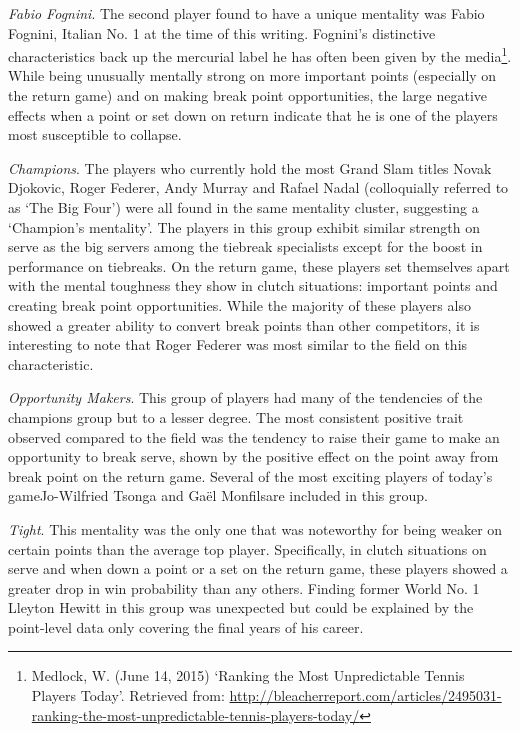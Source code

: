 \documentclass{Latex/svjour3}
\begin{document}
\textit{Fabio Fognini}. The second player found to have a unique mentality was
Fabio Fognini, Italian No. 1 at the time of this writing. Fognini's distinctive
characteristics back up the mercurial label he has often been given by the
media\footnote{Medlock, W. (June 14, 2015) `Ranking the Most Unpredictable
  Tennis Players Today'. Retrieved from:
  \url{http://bleacherreport.com/articles/2495031-ranking-the-most-unpredictable-tennis-players-today/}}. While
being unusually mentally strong on more important points (especially on the
return game) and on making break point opportunities, the large negative effects
when a point or set down on return indicate that he is one of the players most
susceptible to collapse.

\textit{Champions}. The players who currently hold the most Grand Slam titles
Novak Djokovic, Roger Federer, Andy Murray and Rafael Nadal (colloquially
referred to as `The Big Four') were all found in the same mentality cluster,
suggesting a `Champion's mentality'. The players in this group exhibit similar
strength on serve as the big servers among the tiebreak specialists except for
the boost in performance on tiebreaks. On the return game, these players set
themselves apart with the mental toughness they show in clutch situations:
important points and creating break point opportunities. While the majority of
these players also showed a greater ability to convert break points than other
competitors, it is interesting to note that Roger Federer was most similar to
the field on this characteristic.

\textit{Opportunity Makers}. This group of players had many of the tendencies of
the champions group but to a lesser degree. The most consistent positive trait
observed compared to the field was the tendency to raise their game to make an
opportunity to break serve, shown by the positive effect on the point away from
break point on the return game. Several of the most exciting players of today's
game\textemdash Jo-Wilfried Tsonga and Ga\"{e}l Monfils\textemdash are included
in this group. 

\textit{Tight}. This mentality was the only one that was noteworthy for being
weaker on certain points than the average top player. Specifically, in clutch
situations on serve and when down a point or a set on the return game, these
players showed a greater drop in win probability than any others. Finding former
World No. 1 Lleyton Hewitt in this group was unexpected but could be explained
by the point-level data only covering the final years of his career.
\end{document}
